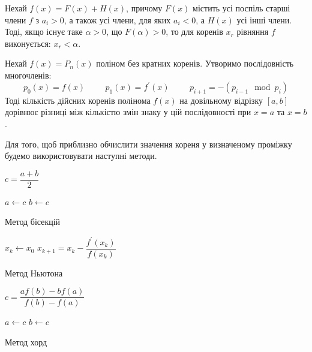 \begin{corollary} \label{th:lagrange}
    Нехай $f(x) = F(x) + H(x)$, причому $F(x)$
    містить усі поспіль старші члени $f$ з $a_i > 0$,
    а також усі члени, для яких $a_i < 0$, а $H(x)$
    усі інші члени. Тоді, якщо існує таке $\alpha>0$,
    що $F(\alpha) > 0$, то для коренів $x_r$ рівняння
    $f$ виконується: $x_r < \alpha$.
\end{corollary}

\begin{theorem}[Штурма] \label{th:sturm}
    Нехай $f(x) = P_n(x)$ поліном без кратних коренів. Утворимо послідовність
    многочленів:
    \[
        p_0(x) = f(x) \hspace{1cm}
        p_1(x) = f^{'}(x) \hspace{1cm}
        p_{i+1} = - (p_{i-1} \mod{p_i})
    \]
    Тоді кількість дійсних коренів полінома $f(x)$ на довільному відрізку $[a, b]$
    дорівнює різниці між кількістю змін знаку у цій послідовності при $x=a$ та $x=b$.
\end{theorem}

Для того, щоб приблизно обчислити значення кореня у
визначеному проміжку будемо використовувати наступні методи.

\begin{algorithm}[H] \label{alg:bisection}
    \SetAlgoLined
    {
        $ c = \dfrac{a+b}{2} $\;

        {
            $a \leftarrow c$\;
        }
        {
            $b \leftarrow c$\;
        }
    }
 \caption{Метод бісекцій}
\end{algorithm}

\begin{algorithm}[H] \label{alg:newton}
    \SetAlgoLined
    $x_k \leftarrow x_0 $\;
    {
        $x_{k+1} = x_k - \dfrac{f^{'}(x_k)}{f(x_k)}$ \;
    }
 \caption{Метод Ньютона}
\end{algorithm}


\begin{algorithm}[H] \label{alg:secant}
    \SetAlgoLined
    {
        $ c = \dfrac{af(b) - bf(a)}{f(b)-f(a)} $\;

        {
            $a \leftarrow c$\;
        }
        {
            $b \leftarrow c$\;
        }
    }
 \caption{Метод хорд}
\end{algorithm}

